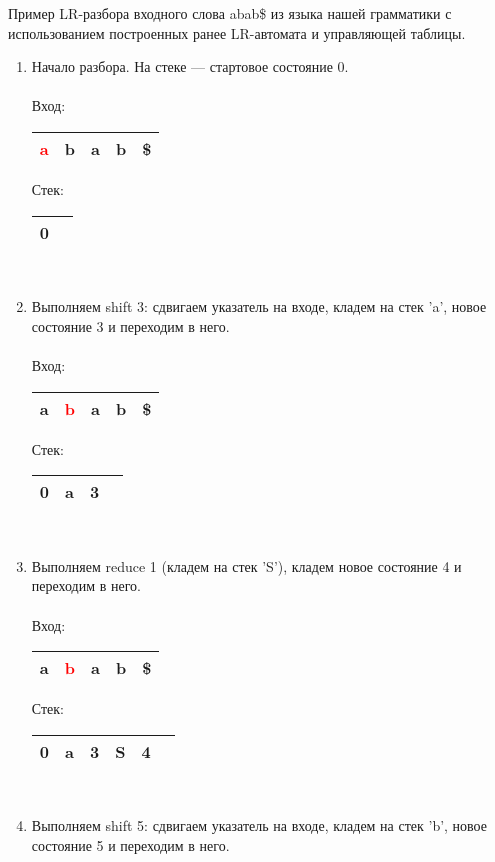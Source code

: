 \begin{example}
Пример LR-разбора входного слова abab\$ из языка нашей грамматики с использованием построенных ранее LR-автомата и управляющей таблицы.
\begin{enumerate}
\item Начало разбора. На стеке --- стартовое состояние 0. \\ \\
Вход: \,
\begin{tabular}[c]{ |c|c|c|c|c| } 
    \hline \textcolor{red}{a} & b & a & b & \$ \\ \hline
\end{tabular}
\qquad Стек: \,
\begin{tabular}[c]{ |c|c } 
    \hline 0 & \\ \hline
\end{tabular}  
\\
\item Выполняем shift 3: сдвигаем указатель на входе, кладем на стек 'a', новое состояние 3 и переходим в него. \\ \\
Вход: \,
\begin{tabular}[c]{ |c|c|c|c|c| } 
    \hline a & \textcolor{red}{b} & a & b & \$ \\ \hline
\end{tabular}
\qquad Стек: \,
\begin{tabular}[c]{ |c|c|c|c } 
    \hline 0 & a & 3 & \\ \hline
\end{tabular}
\\ 
\item Выполняем reduce 1 (кладем на стек 'S'), кладем новое состояние 4 и переходим в него. \\ \\
Вход: \,
\begin{tabular}[c]{ |c|c|c|c|c| } 
    \hline a & \textcolor{red}{b} & a & b & \$ \\ \hline
\end{tabular}
\qquad Стек: \,
\begin{tabular}[c]{ |c|c|c|c|c|c } 
    \hline 0 & a & 3 & S & 4 & \\ \hline
\end{tabular}
\\ 
\item Выполняем shift 5: сдвигаем указатель на входе, кладем на стек 'b', новое состояние 5 и переходим в него. \\ \\

\end{enumerate}
\end{example}
